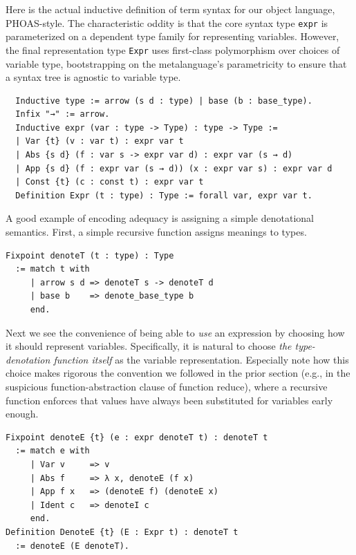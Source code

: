Here is the actual inductive definition of term syntax for our object language, PHOAS-style.
The characteristic oddity is that the core syntax type \texttt{expr} is parameterized on a dependent type family for representing variables.
However, the final representation type \texttt{Expr} uses first-class polymorphism over choices of variable type, bootstrapping on the metalanguage's parametricity to ensure that a syntax tree is agnostic to variable type.
\begin{verbatim}
  Inductive type := arrow (s d : type) | base (b : base_type).
  Infix "→" := arrow.
  Inductive expr (var : type -> Type) : type -> Type :=
  | Var {t} (v : var t) : expr var t
  | Abs {s d} (f : var s -> expr var d) : expr var (s → d)
  | App {s d} (f : expr var (s → d)) (x : expr var s) : expr var d
  | Const {t} (c : const t) : expr var t
  Definition Expr (t : type) : Type := forall var, expr var t.
\end{verbatim}

A good example of encoding adequacy is assigning a simple denotational semantics.
First, a simple recursive function assigns meanings to types.
\begin{verbatim}
Fixpoint denoteT (t : type) : Type
  := match t with
     | arrow s d => denoteT s -> denoteT d
     | base b    => denote_base_type b
     end.
\end{verbatim}

Next we see the convenience of being able to \emph{use} an expression by choosing how it should represent variables.
Specifically, it is natural to choose \emph{the type-denotation function itself} as the variable representation.
Especially note how this choice makes rigorous the convention we followed in the prior section (e.g., in the suspicious function-abstraction clause of function reduce), where a recursive function enforces that values have always been substituted for variables early enough.
\begin{verbatim}
Fixpoint denoteE {t} (e : expr denoteT t) : denoteT t
  := match e with
     | Var v     => v
     | Abs f     => λ x, denoteE (f x)
     | App f x   => (denoteE f) (denoteE x)
     | Ident c   => denoteI c
     end.
Definition DenoteE {t} (E : Expr t) : denoteT t
  := denoteE (E denoteT).
\end{verbatim}

